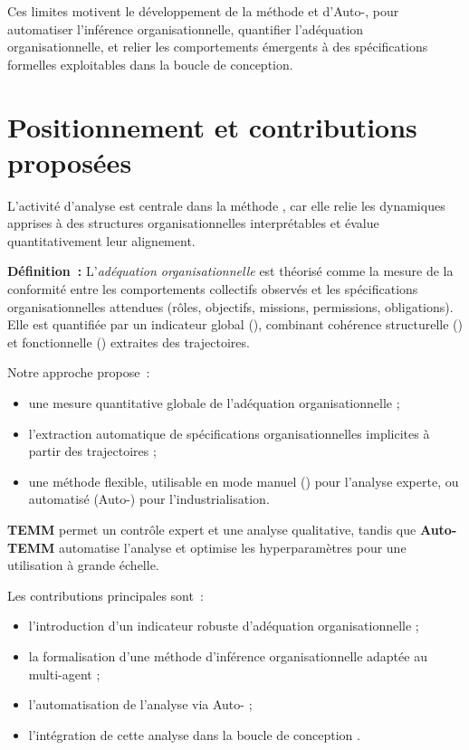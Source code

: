 Ces limites motivent le développement de la méthode  et d’Auto-, pour automatiser l’inférence organisationnelle, quantifier l’adéquation organisationnelle, et relier les comportements émergents à des spécifications formelles exploitables dans la boucle de conception.



\section{Positionnement et contributions proposées}
L’activité d’analyse est centrale dans la méthode , car elle relie les dynamiques apprises à des structures organisationnelles interprétables et évalue quantitativement leur alignement.

\textbf{Définition~:} L’\textit{adéquation organisationnelle} est théorisé comme la mesure de la conformité entre les comportements collectifs observés et les spécifications organisationnelles attendues (rôles, objectifs, missions, permissions, obligations). Elle est quantifiée par un indicateur global (\textbf{}), combinant cohérence structurelle () et fonctionnelle () extraites des trajectoires.

Notre approche propose~:
\begin{itemize}
    \item une mesure quantitative globale de l’adéquation organisationnelle  ;
    \item l’extraction automatique de spécifications organisationnelles implicites à partir des trajectoires ;
    \item une méthode flexible, utilisable en mode manuel () pour l’analyse experte, ou automatisé (Auto-) pour l’industrialisation.
\end{itemize}

\textbf{TEMM} permet un contrôle expert et une analyse qualitative, tandis que \textbf{Auto-TEMM} automatise l’analyse et optimise les hyperparamètres pour une utilisation à grande échelle.

Les contributions principales sont~:
\begin{itemize}
    \item l’introduction d’un indicateur robuste d’adéquation organisationnelle ;
    \item la formalisation d’une méthode d’inférence organisationnelle adaptée au multi-agent ;
    \item l’automatisation de l’analyse via Auto- ;
    \item l’intégration de cette analyse dans la boucle de conception .
\end{itemize}

